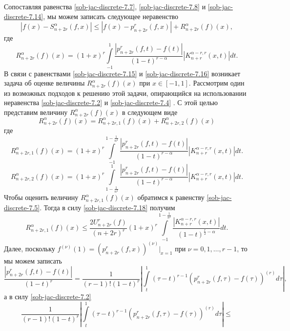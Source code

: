 Сопоставляя равенства \eqref{sob-jac-discrete-7.7}, \eqref{sob-jac-discrete-7.8} и \eqref{sob-jac-discrete-7.14}, мы можем записать следующее неравенство
\begin{equation}\label{sob-jac-discrete-7.15}
|f(x)-S_{n+2r}^\alpha(f,x)|\le  |f(x)-p_{n+2r}^r(f,x)|+ R_{n+2r}^\alpha(f)(x),
\end{equation}
где
\begin{equation}\label{sob-jac-discrete-7.16}
R_{n+2r}^\alpha(f)(x)=(1+x)^r\int\limits_{-1}^1\frac{|p_{n+2r}^r(f,t)-f(t)|}{(1-t)^{r-\alpha}}|K_{n+r}^{\alpha-r,r}(x,t)|dt.
\end{equation}
В связи с равенствами \eqref{sob-jac-discrete-7.15} и \eqref{sob-jac-discrete-7.16} возникает задача об оценке величины $R_{n+2r}^\alpha(f)(x)$ при $x\in[-1,1]$. Рассмотрим один из возможных подходов к решению этой задачи, опирающийся на использовании неравенства \eqref{sob-jac-discrete-7.2} и \eqref{sob-jac-discrete-7.4} . С этой целью представим величину $R_{n+2r}^\alpha(f)(x)$ в следующем виде
\begin{equation}\label{sob-jac-discrete-7.17}
R_{n+2r}^\alpha(f)(x)=R_{n+2r,1}^\alpha(f)(x)+ R_{n+2r,2}^\alpha(f)(x)
\end{equation}
где
\begin{equation}\label{sob-jac-discrete-7.18}
R_{n+2r,1}^\alpha(f)(x)=(1+x)^r\int\limits_{-1}^{1-\frac{1}{n^2}}\frac{|p_{n+2r}^r(f,t)-f(t)|}{(1-t)^{r-\alpha}}
|K_{n+r}^{\alpha-r,r}(x,t)|dt.
\end{equation}
\begin{equation}\label{sob-jac-discrete-7.19}
R_{n+2r,2}^\alpha(f)(x)=(1+x)^r\int\limits_{1-\frac{1}{n^2}}^1\frac{|p_{n+2r}^r(f,t)-f(t)|}{(1-t)^{r-\alpha}}
|K_{n+r}^{\alpha-r,r}(x,t)|dt.
\end{equation}
Чтобы оценить величину $R_{n+2r,1}^\alpha(f)(x)$ обратимся к равенству \eqref{sob-jac-discrete-7.5}. Тогда в силу \eqref{sob-jac-discrete-7.18} получим
\begin{equation}\label{sob-jac-discrete-7.20}
R_{n+2r,1}^\alpha(f)(x)\le \frac{2U_{n+2r}^r(f)}{(n+2r)^{r}}(1+x)^r\int\limits_{-1}^{1-\frac{1}{n^2}}\frac{|K_{n+r}^{\alpha-r,r}(x,t)|}
{(1-t)^{\frac r2-\alpha}}dt.
\end{equation}
Далее, поскольку $f^{(\nu)}(1)=(p_{n+2r}^r(f,x))^{(\nu)}|_{x=1}$ при $\nu=0,1,\ldots,r-1 $, то мы можем записать
$$
 \frac{|p_{n+2r}^r(f,t)-f(t)|}{(1-t)^r} =\frac{1}{(r-1)!(1-t)^r}\left|\int\limits_t^1(\tau-t)^{r-1}(p_{n+2r}^r(f,\tau)-f(\tau))^{(r)}d\tau\right|,
$$
а в силу \eqref{sob-jac-discrete-7.2}
$$
\frac{1}{(r-1)!(1-t)^r}\left|\int\limits_t^1(\tau-t)^{r-1}(p_{n+2r}^r(f,\tau)-f(\tau))^{(r)}d\tau\right|\le
$$
